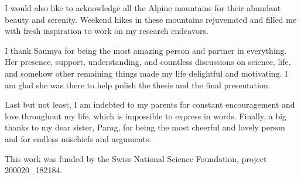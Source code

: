 I would also like to acknowledge all the Alpine mountains for their abundant beauty and serenity. Weekend hikes in these mountains rejuvenated and filled me with fresh inspiration to work on my research endeavors.

I thank Saumya for being the most amazing person and partner in everything.
Her presence, support, understanding, and countless discussions on science, life, and somehow other remaining things made my life delightful and motivating.
I am glad she was there to help polish the thesis and the final presentation.  \clearpage

Last but not least, I am indebted to my parents for constant encouragement and love throughout my life, which is impossible to express in words.
Finally, a big thanks to my dear sister, Parag, for being the most cheerful and lovely person and for endless mischiefs and arguments. %

This work was funded by the Swiss National Science Foundation, project 200020\_182184.

